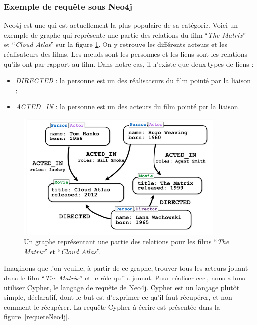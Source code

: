 	\subsubsection{Exemple de requête sous Neo4j}
		Neo4j est une \bddGraphe{} qui est actuellement la plus populaire de sa catégorie. Voici un exemple de graphe qui représente une partie des relations du film \enquote{\textit{The Matrix}} et \enquote{\textit{Cloud Atlas}} sur la figure \ref{grapheNeo4j}. On y retrouve les différents acteurs et les réalisateurs des films. Les nœuds sont les personnes et les liens sont les relations qu'ils ont par rapport au film. Dans notre cas, il n'existe que deux types de liens :
		\vspace{5px}
		\begin{itemize}
			\item \textit{DIRECTED} : la personne est un des réalisateurs du film pointé par la liaison ; 
			\item \textit{ACTED\_IN} : la personne est un des acteurs du film pointé par la liaison. 
		\end{itemize}

		\begin{figure}[H]
			\centering
			\includegraphics[width=0.9\textwidth]{images/graphe.png}
			\caption{Un graphe représentant une partie des relations pour les films \enquote{\textit{The Matrix}} et \enquote{\textit{Cloud Atlas}}.\cite{grapheNeo4j}}
			\label{grapheNeo4j}
		\end{figure}

		Imaginons que l'on veuille, à partir de ce graphe, trouver tous les acteurs jouant dans le film \enquote{\textit{The Matrix}} et le rôle qu'ils jouent. Pour réaliser ceci, nous allons utiliser Cypher, le langage de requête de Neo4j. Cypher est un langage plutôt simple, déclaratif, dont le but est d'exprimer ce qu'il faut récupérer, et non comment le récupérer. La requête Cypher à écrire est présentée dans la figure~\ref{requeteNeo4j}.

